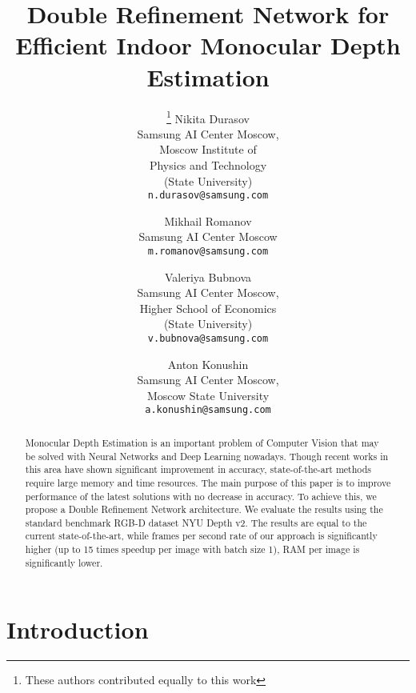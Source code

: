 \documentclass[10pt,twocolumn,letterpaper]{article}
\begin{document}
\title{Double Refinement Network for Efficient Indoor Monocular Depth Estimation}

\author{
\thanks{These authors contributed equally to this work}
Nikita Durasov\\
Samsung AI Center Moscow,\\
Moscow Institute of \\ 
Physics and Technology \\
(State University)\\
{\tt\small n.durasov@samsung.com}
\and
\footnotemark[1]
Mikhail Romanov\\
Samsung AI Center Moscow \\
{\tt\small m.romanov@samsung.com}
\and
\footnotemark[1]
Valeriya Bubnova\\
Samsung AI Center Moscow, \\
Higher School of Economics \\
(State University) \\
{\tt\small v.bubnova@samsung.com}
\and
Anton Konushin \\
Samsung AI Center Moscow, \\
Moscow State University \\
{\tt\small a.konushin@samsung.com}
}


\maketitle

\begin{abstract}
Monocular Depth Estimation is an important problem of Computer Vision that may be solved with Neural Networks and Deep Learning nowadays. Though recent works in this area have shown significant improvement in accuracy, state-of-the-art methods require large memory and time resources. The main purpose of this paper is to improve performance of the latest solutions with no decrease in accuracy. To achieve this, we propose a Double Refinement Network architecture. We evaluate the results using the standard benchmark RGB-D dataset NYU Depth v2. The results are equal to the current state-of-the-art, while frames per second rate of our approach is significantly higher (up to 15 times speedup per image with batch size 1), RAM per image is significantly lower.
\end{abstract}

\section{Introduction}
\end{document}
